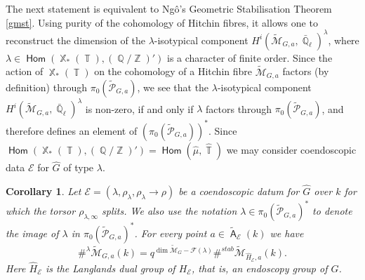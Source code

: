 \documentclass{article}
\DeclareMathOperator{\Hom}{\mathsf{Hom}}
\DeclareMathOperator{\A}{\mathsf{A}}
\newcommand{\Ec}{\mathcal{E}}
\DeclareMathOperator{\Zb}{\mathbb{Z}}
\DeclareMathOperator{\Xb}{\mathbb{X}}
\DeclareMathOperator{\Tb}{\mathbb{T}}
\newcommand{\Mc}{\mathcal{M}}
\DeclareMathOperator{\Spec}{\mathsf{Spec}}
\DeclareMathOperator{\Qb}{\mathbb{Q}}
\newcommand{\CE}{{\mathcal E}}
\newcommand{\CF}{{\mathcal F}}
\newcommand{\wpc}{\widetilde{\mathcal{P}} }
\newcommand{\wmc}{\widetilde{\Mc} }
\newcommand{\wac}{\widetilde{\A} }
\theoremstyle{definition}
\theoremstyle{plain}
\newtheorem{corollary}[definition]{Corollary}
\newtheorem{situation}[definition]{Situation}
\begin{document}


The next statement is equivalent to Ng\^o's Geometric Stabilisation Theorem \ref{gmst}. Using purity of the cohomology of Hitchin fibres, it allows one to reconstruct the dimension of the $\lambda$-isotypical component $H^i(\wmc_{G,a},\bar{\Qb}_{\ell})^{\lambda}$, where $\lambda \in \Hom(\Xb_*(\Tb),(\Qb/\Zb)')$ is a character of finite order.
Since the action of $\Xb_*(\Tb)$ on the cohomology of a Hitchin fibre $\wmc_{G,a}$ factors (by definition) through $\pi_0(\wpc_{G,a})$, we see that the $\lambda$-isotypical component $H^i(\wmc_{G,a},\bar{\Qb}_{\ell})^{\lambda}$ is non-zero, if and only if $\lambda$ factors through $\pi_0(\wpc_{G,a})$, and therefore defines an element of $(\pi_0(\wpc_{G,a}))^*$.
Since $\Hom(\Xb_*(\Tb),(\Qb/\Zb)') = \Hom(\widehat{\mu},\widehat{\Tb})$ we may consider coendoscopic data $\Ec$ for $\widehat{G}$ of type $\lambda$.

\begin{corollary}\label{cor:geometric_endoscopy}  %
Let $\CE=(\lambda,\rho_\lambda,\rho_\lambda \to \rho)$ be a coendoscopic datum for $\widehat G$ over $k$ for which the torsor $\rho_{\lambda,\infty}$ splits. We also use the notation $\lambda \in \pi_0(\wpc_{G,a})^*$ to denote the image of $\lambda$ in $\pi_0(\wpc_{G,a})^*$.
For every point $a \in \widetilde{\A}_\CE(k)$ we have
\[ \#^{\lambda} \wmc_{G,a}(k) =q^{\dim \wmc_G -\CF(\lambda)}\#^{stab} \wmc_{\widehat{H}_\CE,a}(k). \]
Here $\widehat{H}_\CE$ is the Langlands dual group of ${H}_\CE$, that is, an endoscopy group of $G$. 
\end{corollary}
\end{document}
